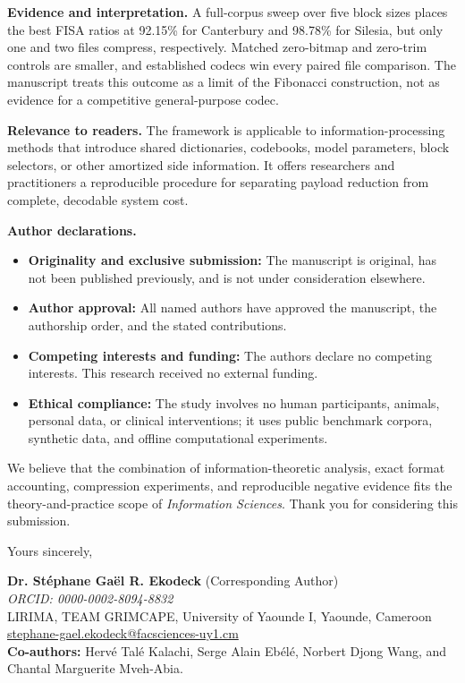 \documentclass[10pt,a4paper]{article}
\newcommand{\lead}[1]{\textcolor{sectionblue}{\textbf{#1}}}
\begin{document}
\lead{Evidence and interpretation.} A full-corpus sweep over five block sizes
places the best FISA ratios at 92.15\% for Canterbury and 98.78\% for Silesia,
but only one and two files compress, respectively. Matched zero-bitmap and
zero-trim controls are smaller, and established codecs win every paired file
comparison. The manuscript treats this outcome as a limit of the Fibonacci
construction, not as evidence for a competitive general-purpose codec.

\lead{Relevance to readers.} The framework is applicable to
information-processing methods that introduce shared dictionaries, codebooks,
model parameters, block selectors, or other amortized side information. It
offers researchers and practitioners a reproducible procedure for separating
payload reduction from complete, decodable system cost.

\lead{Author declarations.}
\begin{itemize}
  \item \textbf{Originality and exclusive submission:} The manuscript is
  original, has not been published previously, and is not under consideration
  elsewhere.
  \item \textbf{Author approval:} All named authors have approved the
  manuscript, the authorship order, and the stated contributions.
  \item \textbf{Competing interests and funding:} The authors declare no
  competing interests. This research received no external funding.
  \item \textbf{Ethical compliance:} The study involves no human participants,
  animals, personal data, or clinical interventions; it uses public benchmark
  corpora, synthetic data, and offline computational experiments.
\end{itemize}

We believe that the combination of information-theoretic analysis, exact
format accounting, compression experiments, and reproducible negative
evidence fits the theory-and-practice scope of \textit{Information Sciences}.
Thank you for considering this submission.

\begin{center}
Yours sincerely,
\end{center}
\vspace{0.5mm}

\textbf{Dr. St\'ephane Ga\"el R. Ekodeck} (Corresponding Author)\\
\textit{ORCID: 0000-0002-8094-8832}\\
LIRIMA, TEAM GRIMCAPE, University of Yaounde I, Yaounde, Cameroon\\
\href{mailto:stephane-gael.ekodeck@facsciences-uy1.cm}{stephane-gael.ekodeck@facsciences-uy1.cm}\\
\textbf{Co-authors:} Herv\'e Tal\'e Kalachi, Serge Alain Eb\'el\'e, Norbert
Djong Wang, and Chantal Marguerite Mveh-Abia.
\end{document}
